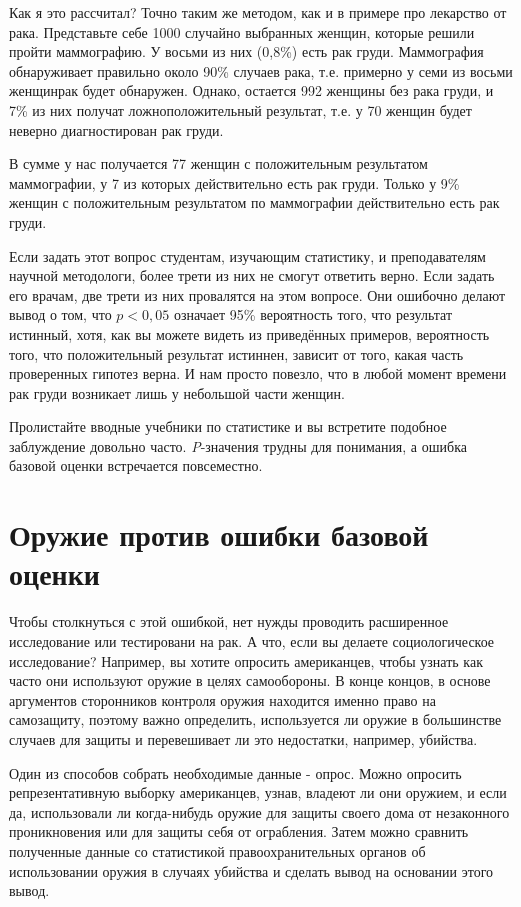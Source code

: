 Как я это рассчитал? Точно таким же методом, как и в примере про лекарство от рака. Представьте себе 1000 случайно выбранных женщин, которые решили пройти маммографию. У восьми из них (0,8\%) есть рак груди. Маммография обнаруживает правильно около 90\% случаев рака, т.е. примерно у семи из восьми женщинрак будет обнаружен. Однако, остается 992 женщины без рака груди, и 7\% из них получат ложноположительный результат, т.е. у 70 женщин будет неверно диагностирован рак груди.

В сумме у нас получается 77 женщин с положительным результатом маммографии, у 7 из которых действительно есть рак груди. Только у 9\% женщин с положительным результатом по маммографии действительно есть рак груди.

Если задать этот вопрос студентам, изучающим статистику, и преподавателям научной методологи, более трети из них не смогут ответить верно.\cite{kramer_how_2005} Если задать его врачам, две трети из них провалятся на этом вопросе.\cite{bramwell_health_2006} Они ошибочно делают вывод о том, что $p < 0,05$ означает 95\% вероятность того, что результат истинный, хотя, как вы можете видеть из приведённых примеров, вероятность того, что положительный результат истиннен, зависит от того, какая часть проверенных гипотез верна. И нам просто повезло, что в любой момент времени рак груди возникает лишь у небольшой части женщин. 

Пролистайте вводные учебники по статистике и вы встретите подобное заблуждение довольно часто. \emph{P}-значения трудны для понимания, а ошибка базовой оценки встречается повсеместно.  


\section{Оружие против ошибки базовой оценки}
\label{chp5:arms-baserateF}

Чтобы столкнуться с этой ошибкой, нет нужды проводить расширенное исследование или тестировани на рак. А что, если вы делаете социологическое исследование? Например, вы хотите опросить американцев, чтобы узнать как часто они используют оружие в целях самообороны. В конце концов, в основе аргументов сторонников контроля оружия находится именно право на самозащиту, поэтому важно определить, используется ли оружие в большинстве случаев для защиты и перевешивает ли это недостатки, например, убийства.

Один из способов собрать необходимые данные - опрос. Можно опросить репрезентативную выборку американцев, узнав, владеют ли они оружием, и если да, использовали ли когда-нибудь оружие для защиты своего дома от незаконного проникновения или для защиты себя от ограбления. Затем можно сравнить полученные данные со статистикой правоохранительных органов об использовании оружия в случаях убийства и сделать вывод на основании этого вывод.

